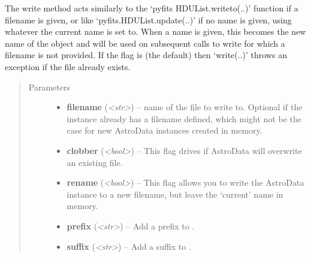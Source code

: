 \documentclass[letterpaper,10pt,english]{sphinxmanual}
\begin{document}
\begin{fulllineitems}
\begin{fulllineitems}
\label{astro_class:astrodata.AstroData.write}
The write method acts similarly to the `pyfits HDUList.writeto(..)'
function if a filename is given, or like `pyfits.HDUList.update(..)' if 
no name is given, using whatever the current name is set to. When a name
is given, this becomes the new name of the  object and
will be used on subsequent calls to  write for which a filename is not
provided. If the  flag is  (the default) then 
`write(..)' throws an exception if the file already exists.
\begin{quote}\begin{description}
\item[{Parameters}] \leavevmode\begin{itemize}
\item {} 
\textbf{filename} (\emph{\textless{}str\textgreater{}}) -- name of the file to write to. Optional if the instance
already has a filename defined, which might not be the 
case for new AstroData instances created in memory.

\item {} 
\textbf{clobber} (\emph{\textless{}bool\textgreater{}}) -- This flag drives if AstroData will overwrite an existing
file.

\item {} 
\textbf{rename} (\emph{\textless{}bool\textgreater{}}) -- This flag allows you to write the AstroData instance to
a new filename, but leave the `current' name in memory.

\item {} 
\textbf{prefix} (\emph{\textless{}str\textgreater{}}) -- Add a prefix to .

\item {} 
\textbf{suffix} (\emph{\textless{}str\textgreater{}}) -- Add a suffix to .

\end{itemize}

\end{description}\end{quote}

\end{fulllineitems}


\end{fulllineitems}
\end{document}
